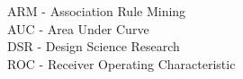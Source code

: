 \begin{abbreviation}
\noindent ARM - Association Rule Mining\\[0.1cm]
\noindent AUC - Area Under Curve\\[0.1cm]
\noindent DSR - Design Science Research\\[0.1cm]
\noindent ROC - Receiver Operating Characteristic\\[0.1cm]
\end{abbreviation}
